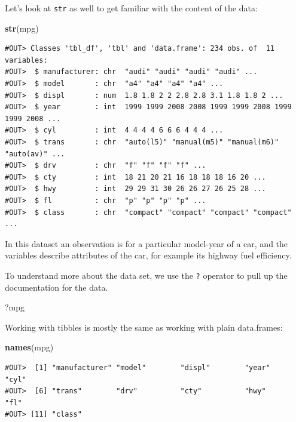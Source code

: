\documentclass[]{book}
\newenvironment{Shaded}{\begin{snugshade}}{\end{snugshade}}
\newcommand{\KeywordTok}[1]{\textcolor[rgb]{0.13,0.29,0.53}{\textbf{#1}}}
\newcommand{\NormalTok}[1]{#1}
\begin{document}
Let's look at \texttt{str} as well to get familiar with the content of
the data:

\begin{Shaded}
\begin{Highlighting}[]
\KeywordTok{str}\NormalTok{(mpg)}
\end{Highlighting}
\end{Shaded}

\begin{verbatim}
#OUT> Classes 'tbl_df', 'tbl' and 'data.frame': 234 obs. of  11 variables:
#OUT>  $ manufacturer: chr  "audi" "audi" "audi" "audi" ...
#OUT>  $ model       : chr  "a4" "a4" "a4" "a4" ...
#OUT>  $ displ       : num  1.8 1.8 2 2 2.8 2.8 3.1 1.8 1.8 2 ...
#OUT>  $ year        : int  1999 1999 2008 2008 1999 1999 2008 1999 1999 2008 ...
#OUT>  $ cyl         : int  4 4 4 4 6 6 6 4 4 4 ...
#OUT>  $ trans       : chr  "auto(l5)" "manual(m5)" "manual(m6)" "auto(av)" ...
#OUT>  $ drv         : chr  "f" "f" "f" "f" ...
#OUT>  $ cty         : int  18 21 20 21 16 18 18 18 16 20 ...
#OUT>  $ hwy         : int  29 29 31 30 26 26 27 26 25 28 ...
#OUT>  $ fl          : chr  "p" "p" "p" "p" ...
#OUT>  $ class       : chr  "compact" "compact" "compact" "compact" ...
\end{verbatim}

In this dataset an observation is for a particular model-year of a car,
and the variables describe attributes of the car, for example its
highway fuel efficiency.

To understand more about the data set, we use the \texttt{?} operator to
pull up the documentation for the data.

\begin{Shaded}
\begin{Highlighting}[]
\NormalTok{?mpg}
\end{Highlighting}
\end{Shaded}

Working with tibbles is mostly the same as working with plain
data.frames:

\begin{Shaded}
\begin{Highlighting}[]
\KeywordTok{names}\NormalTok{(mpg)}
\end{Highlighting}
\end{Shaded}

\begin{verbatim}
#OUT>  [1] "manufacturer" "model"        "displ"        "year"         "cyl"         
#OUT>  [6] "trans"        "drv"          "cty"          "hwy"          "fl"          
#OUT> [11] "class"
\end{verbatim}
\end{document}
